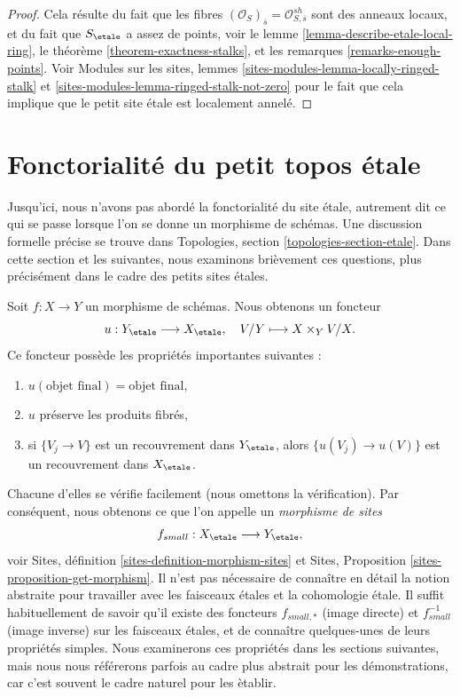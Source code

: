 \begin{proof}
Cela r\'esulte du fait que les fibres
$(\mathcal{O}_S)_{\overline{s}} = \mathcal{O}^{sh}_{S, \overline{s}}$ sont
des anneaux locaux, et du fait que $S_\etale$ a assez de points, voir
le lemme \ref{lemma-describe-etale-local-ring},
le th\'eor\`eme \ref{theorem-exactness-stalks},
et les
remarques \ref{remarks-enough-points}.
Voir
Modules sur les sites, lemmes \ref{sites-modules-lemma-locally-ringed-stalk} et
\ref{sites-modules-lemma-ringed-stalk-not-zero}
pour le fait que cela implique que le petit site \'etale est localement annel\'e.
\end{proof}






\section{Fonctorialit\'e du petit topos \'etale}
\label{section-functoriality}

\noindent
Jusqu'ici, nous n'avons pas abord\'e la fonctorialit\'e du site \'etale,
autrement dit ce qui se passe lorsque l'on se donne un morphisme de sch\'emas. Une
discussion formelle pr\'ecise se trouve dans
Topologies, section \ref{topologies-section-etale}.
Dans cette section et les suivantes, nous examinons bri\`evement ces questions,
plus pr\'ecis\'ement dans le cadre des petits sites \'etales.

\medskip\noindent
Soit $f : X \to Y$ un morphisme de sch\'emas. Nous obtenons un foncteur
\begin{equation}
\label{equation-functorial}
u : Y_\etale \longrightarrow X_\etale, \quad
V/Y \longmapsto X \times_Y V/X.
\end{equation}
Ce foncteur poss\`ede les propri\'et\'es importantes suivantes :
\begin{enumerate}
\item $u(\text{objet final}) = \text{objet final}$,
\item $u$ pr\'eserve les produits fibr\'es,
\item si $\{V_j \to V\}$ est un recouvrement dans $Y_\etale$, alors
$\{u(V_j) \to u(V)\}$ est un recouvrement dans $X_\etale$.
\end{enumerate}
Chacune d'elles se v\'erifie facilement (nous omettons la v\'erification). Par cons\'equent, nous obtenons ce
que l'on appelle un {\it morphisme de sites}
$$
f_{small} : X_\etale \longrightarrow Y_\etale,
$$
voir
Sites, définition \ref{sites-definition-morphism-sites}
et
Sites, Proposition \ref{sites-proposition-get-morphism}.
Il n'est pas n\'ecessaire de conna\^itre en d\'etail la notion abstraite
pour travailler avec les faisceaux \'etales et la cohomologie \'etale.
Il suffit habituellement de savoir qu'il existe des foncteurs
$f_{small, *}$ (image directe) et $f_{small}^{-1}$ (image inverse)
sur les faisceaux \'etales, et de conna\^itre quelques-unes de leurs propri\'et\'es simples.
Nous examinerons ces propri\'et\'es dans les sections suivantes, mais nous nous
r\'ef\'ererons parfois au cadre plus abstrait pour les d\'emonstrations, car
c'est souvent le cadre naturel pour les \`etablir.


